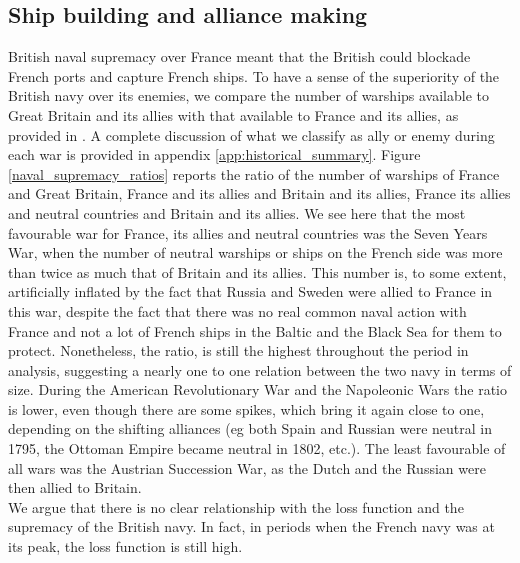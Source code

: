 \documentclass[12pt,a4paper,notitlepage,english]{article}
\begin{document}
\subsection{Ship building and alliance making}
British naval supremacy over France meant that the British could blockade French ports and capture French ships.
To have a sense of the superiority of the British navy over its enemies, we compare the number of warships available to Great Britain and its allies with that available to France and its allies, as provided in \cite{Modelski1988}. 
A complete discussion of what we classify as ally or enemy during each war is provided in appendix \ref{app:historical_summary}. 
Figure \ref{naval_supremacy_ratios} reports the ratio of the number of warships of France and Great Britain, France and its allies and Britain and its allies, France its allies and neutral countries and Britain and its allies.
We see here that the most favourable war for France, its allies and neutral countries was the Seven Years War, when the number of neutral warships or ships on the French side was more than twice as much that of Britain and its allies. This number is, to some extent, artificially inflated by the fact that Russia and Sweden were allied to France in this war, despite the fact that there was no real common naval action with France and not a lot of French ships in the Baltic and the Black Sea for them to protect. Nonetheless, the ratio, is still the highest throughout the period in analysis, suggesting a nearly one to one relation between the two navy in terms of size. 
During the American Revolutionary War and the Napoleonic Wars the ratio is lower, even though there are some spikes, which bring it again close to one, depending on the shifting alliances (eg both Spain and Russian were neutral in 1795, the Ottoman Empire became neutral in 1802, etc.). 
The least favourable of all wars was the Austrian Succession War, as the Dutch and the Russian were then allied to Britain.  \\
We argue that there is no clear relationship with the loss function and the supremacy of the British navy. In fact, in periods when the French navy was at its peak, the loss function is still high. 
\end{document}
